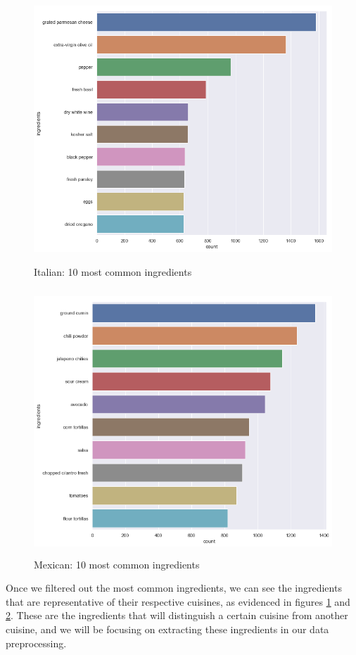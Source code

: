 \documentclass[12pt]{article}
\begin{document}
\begin{figure}
\includegraphics[width=\textwidth, height=10cm]{italian-most-common-ingredients.png}
\caption{Italian: 10 most common ingredients}
\label{fig: italian-most-common-ingredients}
\end{figure}

\begin{figure}
\includegraphics[width=\textwidth, height=10cm]{mexican-most-common-ingredients.png}
\caption{Mexican: 10 most common ingredients}
\label{fig: mexican-most-common-ingredients}
\end{figure}

Once we filtered out the most common ingredients, we can see the ingredients that are representative of their respective cuisines, as evidenced in figures \ref{fig: italian-most-common-ingredients} and \ref{fig: mexican-most-common-ingredients}. These are the ingredients that will distinguish a certain cuisine from another cuisine, and we will be focusing on extracting these ingredients in our data preprocessing.
\end{document}
